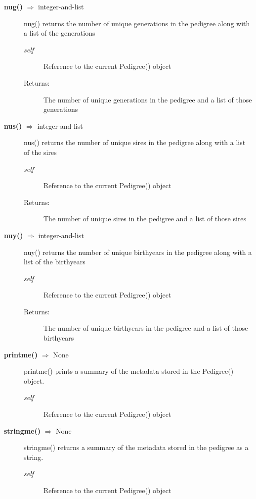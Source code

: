 \begin{description}
\item[\textbf{nug()} $\Rightarrow$ integer-and-list]
nug() returns the number of unique generations in the pedigree along with a list of the generations
\begin{description}
\item[\emph{self}] Reference to the current Pedigree() object
\item[Returns:] The number of unique generations in the pedigree and a list of those generations
\end{description}

\item[\textbf{nus()} $\Rightarrow$ integer-and-list]
nus() returns the number of unique sires in the pedigree along with a list of the sires
\begin{description}
\item[\emph{self}] Reference to the current Pedigree() object
\item[Returns:] The number of unique sires in the pedigree and a list of those sires
\end{description}

\item[\textbf{nuy()} $\Rightarrow$ integer-and-list]
nuy() returns the number of unique birthyears in the pedigree along with a list of the birthyears
\begin{description}
\item[\emph{self}] Reference to the current Pedigree() object
\item[Returns:] The number of unique birthyears in the pedigree and a list of those birthyears
\end{description}

\item[\textbf{printme()} $\Rightarrow$ None]
printme() prints a summary of the metadata stored in the Pedigree() object.
\begin{description}
\item[\emph{self}] Reference to the current Pedigree() object
\end{description}

\item[\textbf{stringme()} $\Rightarrow$ None]
stringme() returns a summary of the metadata stored in the pedigree as a string.
\begin{description}
\item[\emph{self}] Reference to the current Pedigree() object
\end{description}

\end{description}